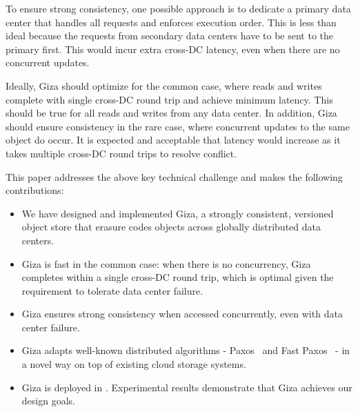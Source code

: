 To ensure strong consistency, one possible approach is to dedicate a primary data center that handles all requests and enforces execution order. This is less than ideal because the requests from secondary data centers have to be sent to the primary first. This would incur extra cross-DC latency, even when there are no concurrent updates.

Ideally, Giza should optimize for the common case, where reads and writes complete with single cross-DC round trip and achieve minimum latency. This should be true for all reads and writes from any data center. In addition, Giza should ensure consistency in the rare case, where concurrent updates to the same object do occur. It is expected and acceptable that latency would increase as it takes multiple cross-DC round trips to resolve conflict.


This paper addresses the above key technical challenge and makes the following contributions:
\begin{itemize}
    \item We have designed and implemented Giza, a strongly consistent,
      versioned object store that erasure codes objects across globally
      distributed data centers.
    \item Giza is fast in the common case: when there is no concurrency, Giza
      completes within a single cross-DC round trip, which is optimal given the
      requirement to tolerate data center failure.
    \item Giza ensures strong consistency when accessed concurrently, even with data center
      failure.
    \item Giza adapts well-known distributed algorithms - Paxos~\cite{lamport01paxos}
      and Fast Paxos~\cite{lamport05fast} - in a novel way on top of existing cloud storage systems.
    \item Giza is deployed in \deployment. Experimental results demonstrate
      that Giza achieves our design goals. %
\end{itemize}
